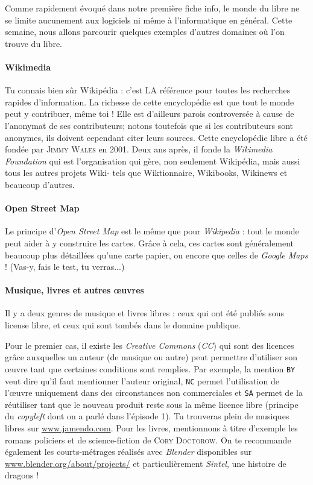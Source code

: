 \documentclass[10pt]{../fiche}
\begin{document}

\vspace*{0.5cm} 
Comme rapidement évoqué dans notre première fiche info, le monde du libre ne se limite aucunement aux logiciels ni même à l'informatique en général. Cette semaine, nous allons parcourir quelques exemples d'autres domaines où l'on trouve du libre.

\paragraph{Wikimedia}
Tu connais bien sûr Wikipédia : c'est LA référence pour toutes les recherches rapides d’information. La richesse de cette encyclopédie est que tout le monde peut y contribuer, même toi ! Elle est d'ailleurs parois controversée à cause de l'anonymat de ses contributeurs; notons toutefois que si les contributeurs sont anonymes, ils doivent cependant citer leurs sources. Cette encyclopédie libre a été fondée par \textsc{Jimmy Wales} en 2001. Deux ans après, il fonde la \textit{Wikimedia Foundation} qui est l'organisation qui gère, non seulement Wikipédia, mais aussi tous les autres projets Wiki- tels que Wiktionnaire, Wikibooks, Wikinews et beaucoup d'autres. 

\paragraph{Open Street Map}
Le principe d'\textit{Open Street Map} est le même que pour \textit{Wikipedia} : tout le monde peut aider à y construire les cartes. Grâce à cela, ces cartes sont généralement beaucoup plus détaillées qu'une carte papier, ou encore que celles de \textit{Google Maps} ! (Vas-y, fais le test, tu verras...)

\paragraph{Musique, livres et autres \oe uvres}
Il y a deux genres de musique et livres libres : ceux qui ont été publiés sous license libre, et ceux qui sont tombés dans le domaine publique.

Pour le premier cas, il existe les \textit{Creative Commons} (\textit{CC}) qui sont des licences grâce auxquelles un auteur (de musique ou autre) peut permettre
d'utiliser son \oe uvre tant que certaines conditions sont remplies. Par exemple, la mention \texttt{BY} veut dire qu'il faut mentionner l'auteur original, \texttt{NC} permet l'utilisation de l'\oe uvre
uniquement dans des circonstances non commerciales et \texttt{SA} permet de la réutiliser tant que le nouveau produit reste sous la même licence libre (principe du \textit{copyleft} dont on a parlé dans l'épisode 1). Tu trouveras plein de musiques libres sur \url{www.jamendo.com}. Pour les livres, mentionnons à titre d'exemple les romans policiers et de science-fiction de \textsc{Cory Doctorow}. On te recommande également les courts-métrages réalisés avec \textit{Blender} disponibles sur \url{www.blender.org/about/projects/} et particulièrement \textit{Sintel}, une histoire de dragons !
\end{document}
